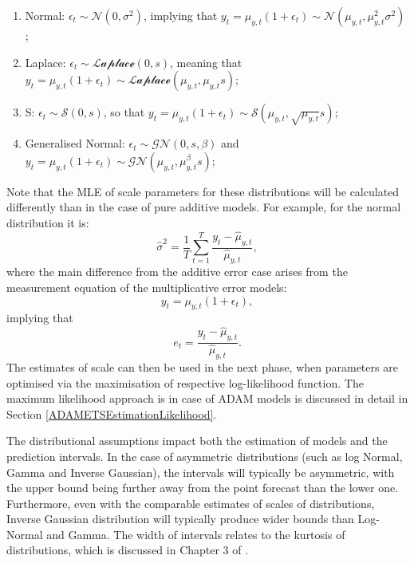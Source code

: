 \documentclass[
]{book}
\providecommand{\tightlist}{%
  \setlength{\itemsep}{0pt}\setlength{\parskip}{0pt}}
\theoremstyle{definition}
\theoremstyle{definition}
\theoremstyle{definition}
\theoremstyle{definition}
\theoremstyle{remark}
\begin{document}
\begin{enumerate}
\def\labelenumi{\arabic{enumi}.}
\tightlist
\item
  Normal: \(\epsilon_t \sim \mathcal{N}(0, \sigma^2)\), implying that \(y_t = \mu_{y,t} (1+\epsilon_t) \sim \mathcal{N}(\mu_{y,t}, \mu_{y,t}^2 \sigma^2)\);
\item
  Laplace: \(\epsilon_t \sim \mathcal{Laplace}(0, s)\), meaning that \(y_t = \mu_{y,t} (1+\epsilon_t) \sim \mathcal{Laplace}(\mu_{y,t}, \mu_{y,t} s)\);
\item
  S: \(\epsilon_t \sim \mathcal{S}(0, s)\), so that \(y_t = \mu_{y,t} (1+\epsilon_t) \sim \mathcal{S}(\mu_{y,t}, \sqrt{\mu_{y,t}} s)\);
\item
  Generalised Normal: \(\epsilon_t \sim \mathcal{GN}(0, s, \beta)\) and \(y_t = \mu_{y,t} (1+\epsilon_t) \sim \mathcal{GN}(\mu_{y,t}, \mu_{y,t}^\beta s)\);
\end{enumerate}

Note that the MLE of scale parameters for these distributions will be calculated differently than in the case of pure additive models. For example, for the normal distribution it is:
\begin{equation}
    \hat{\sigma}^2 = \frac{1}{T}\sum_{t=1}^T \frac{y_t-\hat{\mu}_{y,t}}{\hat{\mu}_{y,t}} ,
    \label{eq:ETSMultiplicativeErrorMLESigmaNormal}
\end{equation}
where the main difference from the additive error case arises from the measurement equation of the multiplicative error models:
\begin{equation}
    y_t = \mu_{y,t} (1+\epsilon_t),
    \label{eq:ETSMultiplicativeErrorMeasurement}
\end{equation}
implying that
\begin{equation}
    e_t = \frac{y_t-\hat{\mu}_{y,t}}{\hat{\mu}_{y,t}}.
    \label{eq:ETSMultiplicativeErrorFormula}
\end{equation}
The estimates of scale can then be used in the next phase, when parameters are optimised via the maximisation of respective log-likelihood function. The maximum likelihood approach is in case of ADAM models is discussed in detail in Section \ref{ADAMETSEstimationLikelihood}.

The distributional assumptions impact both the estimation of models and the prediction intervals. In the case of asymmetric distributions (such as log Normal, Gamma and Inverse Gaussian), the intervals will typically be asymmetric, with the upper bound being further away from the point forecast than the lower one. Furthermore, even with the comparable estimates of scales of distributions, Inverse Gaussian distribution will typically produce wider bounds than Log-Normal and Gamma. The width of intervals relates to the kurtosis of distributions, which is discussed in Chapter 3 of \citet{SvetunkovSBA}.
\end{document}
